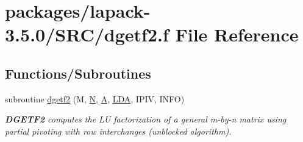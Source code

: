\hypertarget{dgetf2_8f}{}\section{packages/lapack-\/3.5.0/\+S\+R\+C/dgetf2.f File Reference}
\label{dgetf2_8f}
\subsection*{Functions/\+Subroutines}
\begin{DoxyCompactItemize}
\item 
subroutine \hyperlink{group__doubleGEcomputational_ga8360b5b2c819e19c82bfd7e6b8285f74}{dgetf2} (M, \hyperlink{polmisc_8c_a0240ac851181b84ac374872dc5434ee4}{N}, \hyperlink{classA}{A}, \hyperlink{example__user_8c_ae946da542ce0db94dced19b2ecefd1aa}{L\+D\+A}, I\+P\+I\+V, I\+N\+F\+O)
\begin{DoxyCompactList}\small\item\em {\bfseries D\+G\+E\+T\+F2} computes the L\+U factorization of a general m-\/by-\/n matrix using partial pivoting with row interchanges (unblocked algorithm). \end{DoxyCompactList}\end{DoxyCompactItemize}
